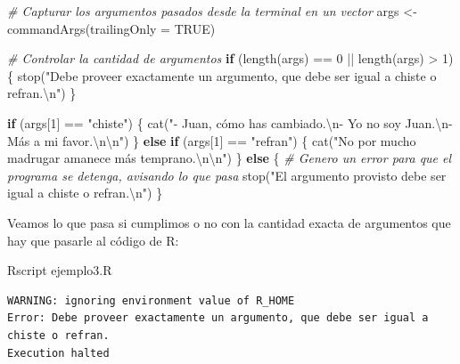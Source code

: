 \documentclass[
]{book}
\newenvironment{Shaded}{\begin{snugshade}}{\end{snugshade}}
\newcommand{\AttributeTok}[1]{\textcolor[rgb]{0.77,0.63,0.00}{#1}}
\newcommand{\CommentTok}[1]{\textcolor[rgb]{0.56,0.35,0.01}{\textit{#1}}}
\newcommand{\ConstantTok}[1]{\textcolor[rgb]{0.00,0.00,0.00}{#1}}
\newcommand{\ControlFlowTok}[1]{\textcolor[rgb]{0.13,0.29,0.53}{\textbf{#1}}}
\newcommand{\DecValTok}[1]{\textcolor[rgb]{0.00,0.00,0.81}{#1}}
\newcommand{\ExtensionTok}[1]{#1}
\newcommand{\FunctionTok}[1]{\textcolor[rgb]{0.00,0.00,0.00}{#1}}
\newcommand{\NormalTok}[1]{#1}
\newcommand{\OtherTok}[1]{\textcolor[rgb]{0.56,0.35,0.01}{#1}}
\newcommand{\SpecialCharTok}[1]{\textcolor[rgb]{0.00,0.00,0.00}{#1}}
\newcommand{\StringTok}[1]{\textcolor[rgb]{0.31,0.60,0.02}{#1}}
\begin{document}
\begin{Shaded}
\begin{Highlighting}[]
\CommentTok{\# Capturar los argumentos pasados desde la terminal en un vector}
\NormalTok{args }\OtherTok{\textless{}{-}} \FunctionTok{commandArgs}\NormalTok{(}\AttributeTok{trailingOnly =} \ConstantTok{TRUE}\NormalTok{)}

\CommentTok{\# Controlar la cantidad de argumentos}
\ControlFlowTok{if}\NormalTok{ (}\FunctionTok{length}\NormalTok{(args) }\SpecialCharTok{==} \DecValTok{0} \SpecialCharTok{||} \FunctionTok{length}\NormalTok{(args) }\SpecialCharTok{\textgreater{}} \DecValTok{1}\NormalTok{) \{}
    \FunctionTok{stop}\NormalTok{(}\StringTok{"Debe proveer exactamente un argumento, que debe ser igual a chiste o refran.}\SpecialCharTok{\textbackslash{}n}\StringTok{"}\NormalTok{)}
\NormalTok{\}}

\ControlFlowTok{if}\NormalTok{ (args[}\DecValTok{1}\NormalTok{] }\SpecialCharTok{==} \StringTok{"chiste"}\NormalTok{) \{}
    \FunctionTok{cat}\NormalTok{(}\StringTok{"{-} Juan, cómo has cambiado.}\SpecialCharTok{\textbackslash{}n}\StringTok{{-} Yo no soy Juan.}\SpecialCharTok{\textbackslash{}n}\StringTok{{-} Más a mi favor.}\SpecialCharTok{\textbackslash{}n\textbackslash{}n}\StringTok{"}\NormalTok{)}
\NormalTok{\} }\ControlFlowTok{else} \ControlFlowTok{if}\NormalTok{ (args[}\DecValTok{1}\NormalTok{] }\SpecialCharTok{==} \StringTok{"refran"}\NormalTok{) \{}
    \FunctionTok{cat}\NormalTok{(}\StringTok{"No por mucho madrugar amanece más temprano.}\SpecialCharTok{\textbackslash{}n\textbackslash{}n}\StringTok{"}\NormalTok{)}
\NormalTok{\} }\ControlFlowTok{else}\NormalTok{ \{}
    \CommentTok{\# Genero un error para que el programa se detenga, avisando lo que pasa}
    \FunctionTok{stop}\NormalTok{(}\StringTok{"El argumento provisto debe ser igual a chiste o refran.}\SpecialCharTok{\textbackslash{}n}\StringTok{"}\NormalTok{)}
\NormalTok{\}}
\end{Highlighting}
\end{Shaded}

Veamos lo que pasa si cumplimos o no con la cantidad exacta de argumentos que hay que pasarle al código de R:

\begin{Shaded}
\begin{Highlighting}[]
\ExtensionTok{Rscript}\NormalTok{ ejemplo3.R}
\end{Highlighting}
\end{Shaded}

\begin{verbatim}
WARNING: ignoring environment value of R_HOME
Error: Debe proveer exactamente un argumento, que debe ser igual a chiste o refran.
Execution halted
\end{verbatim}
\end{document}
